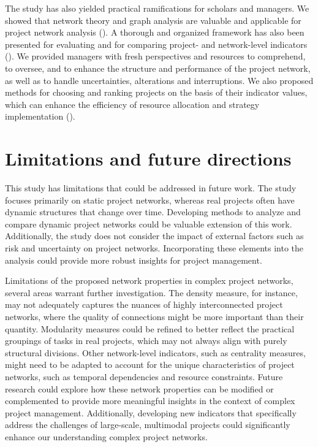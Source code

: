 \documentclass[preprint,
3p]{elsarticle} %
\begin{document}
The study has also yielded practical ramifications for scholars and
managers. We showed that network theory and graph analysis are valuable
and applicable for project network analysis (). A thorough
and organized framework has also been presented for evaluating and for
comparing project- and network-level indicators (). We
provided managers with fresh perspectives and resources to comprehend,
to oversee, and to enhance the structure and performance of the project
network, as well as to handle uncertainties, alterations and
interruptions. We also proposed methods for choosing and ranking
projects on the basis of their indicator values, which can enhance the
efficiency of resource allocation and strategy implementation
().

\section{Limitations and future directions}\label{sec:limitations}

This study has limitations that could be addressed in future work. The
study focuses primarily on static project networks, whereas real
projects often have dynamic structures that change over time. Developing
methods to analyze and compare dynamic project networks could be
valuable extension of this work. Additionally, the study does not
consider the impact of external factors such as risk and uncertainty on
project networks. Incorporating these elements into the analysis could
provide more robust insights for project management.

Limitations of the proposed network properties in complex project
networks, several areas warrant further investigation. The density
measure, for instance, may not adequately captures the nuances of highly
interconnected project networks, where the quality of connections might
be more important than their quantity. Modularity measures could be
refined to better reflect the practical groupings of tasks in real
projects, which may not always align with purely structural divisions.
Other network-level indicators, such as centrality measures, might need
to be adapted to account for the unique characteristics of project
networks, such as temporal dependencies and resource constraints. Future
research could explore how these network properties can be modified or
complemented to provide more meaningful insights in the context of
complex project management. Additionally, developing new indicators that
specifically address the challenges of large-scale, multimodal projects
could significantly enhance our understanding complex project networks.
\end{document}
